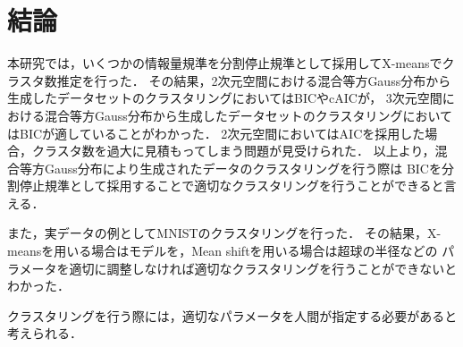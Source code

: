 \section{結論}

本研究では，いくつかの情報量規準を分割停止規準として採用してX-meansでクラスタ数推定を行った．
その結果，2次元空間における混合等方Gauss分布から生成したデータセットのクラスタリングにおいてはBICやcAICが，
3次元空間における混合等方Gauss分布から生成したデータセットのクラスタリングにおいてはBICが適していることがわかった．
2次元空間においてはAICを採用した場合，クラスタ数を過大に見積もってしまう問題が見受けられた．
以上より，混合等方Gauss分布により生成されたデータのクラスタリングを行う際は
BICを分割停止規準として採用することで適切なクラスタリングを行うことができると言える．

また，実データの例としてMNISTのクラスタリングを行った．
その結果，X-meansを用いる場合はモデルを，Mean shiftを用いる場合は超球の半径などの
パラメータを適切に調整しなければ適切なクラスタリングを行うことができないとわかった．

クラスタリングを行う際には，適切なパラメータを人間が指定する必要があると考えられる．

